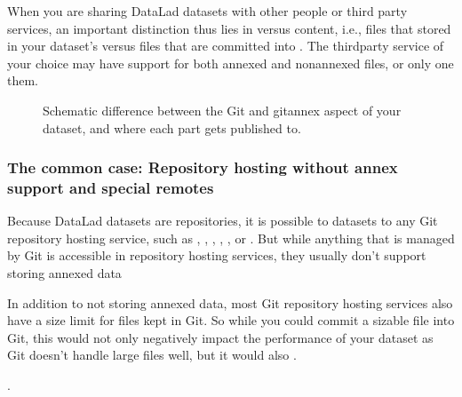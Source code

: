 \sphinxAtStartPar
When you are sharing DataLad datasets with other people or third party services,
an important distinction thus lies in  versus  content, i.e.,
files that stored in your dataset’s {\hyperref[\detokenize{glossary:term-annex}]{}} versus files that are committed
into {\hyperref[\detokenize{glossary:term-Git}]{}}.
The third\sphinxhyphen{}party service of your choice may have support for both annexed and non\sphinxhyphen{}annexed files, or only one them.

\begin{figure}[tbp]
\centering
\capstart

\noindent{}
\caption{Schematic difference between the Git and git\sphinxhyphen{}annex aspect of your dataset, and where each part  gets published to.}\label{\detokenize{basics/101-138-sharethirdparty:id8}}\end{figure}


\subsubsection{The common case: Repository hosting without annex support and special remotes}
\label{\detokenize{basics/101-138-sharethirdparty:the-common-case-repository-hosting-without-annex-support-and-special-remotes}}
\sphinxAtStartPar
Because DataLad datasets are {\hyperref[\detokenize{glossary:term-Git}]{}} repositories, it is possible to
 datasets to any Git repository hosting service, such as
{\hyperref[\detokenize{glossary:term-GitHub}]{}}, {\hyperref[\detokenize{glossary:term-GitLab}]{}}, {\hyperref[\detokenize{glossary:term-GIN}]{}}, {\hyperref[\detokenize{glossary:term-Bitbucket}]{}}, ,
or .
But while anything that is managed by Git is accessible in repository hosting services, they usually don’t support storing annexed data%
\begin{footnote}\sphinxAtStartFootnote
In addition to not storing annexed data, most Git repository hosting services also have a size limit for files kept in Git. So while you could  commit a sizable file into Git, this would not only negatively impact the performance of your dataset as Git doesn’t handle large files well, but it would also .
%
\end{footnote}.


